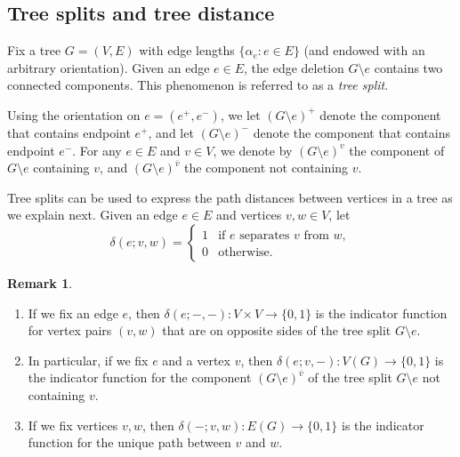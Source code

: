 \documentclass[12pt]{amsart}
\theoremstyle{definition}
\newtheorem{rmk}[thm]{Remark}
\begin{document}
\subsection{Tree splits and tree distance}
\label{sec:tree-splits}


Fix a tree $G = (V,E)$ with edge lengths $\{ \alpha_e \colon e \in E\}$ (and endowed with an arbitrary orientation). Given an edge $e \in E$, the edge deletion $G \setminus e$ contains two connected components. This phenomenon is referred to as a {\em tree split}.

Using the orientation on $e = (e^+,e^-)$,
we let $(G \setminus e)^+$ denote the component that contains endpoint $e^+$, and let $(G\setminus e)^-$ denote the component that contains endpoint $e^-$.
For any $e \in E$ and $v \in V$, we denote by $(G \setminus e)^{v}$ the component of $G\setminus e$ containing $v$, and $(G\setminus e)^{\overline v}$ the component not containing $v$.

Tree splits can be used to express the path distances between vertices in a tree as we explain next.
Given an edge $e\in E$ and vertices $v,w \in V$, let 
\begin{equation}
\delta(e;v,w) = \begin{cases}
	1 &\text{if $e$ separates  $v$ from $w$}, \\
	0 &\text{otherwise}.
\end{cases}
\end{equation}

\begin{rmk}\label{rmk:delta-properties}
\hfill
\begin{enumerate}[label=(\roman*)]
\item If we fix an edge $e$, then $\delta(e; -, -): V \times V \to \{0, 1\}$ is the indicator function for vertex pairs $(v, w)$ that are on opposite sides of the tree split $G \setminus e$.

\item 
In particular, if we fix $e$ and a vertex $v$,
then $\delta(e;v, -) \colon V(G) \to \{0,1\}$ 
is the indicator function for the component 
$(G \setminus e)^{\overline v}$ of the tree split $G \setminus e$ not containing $v$.

\item If we fix vertices $v, w$, then $\delta(-;v,w) \colon E(G) \to \{0,1\}$
is the indicator function for the unique path between $v$ and $w$.
\end{enumerate}
\end{rmk}
\end{document}
